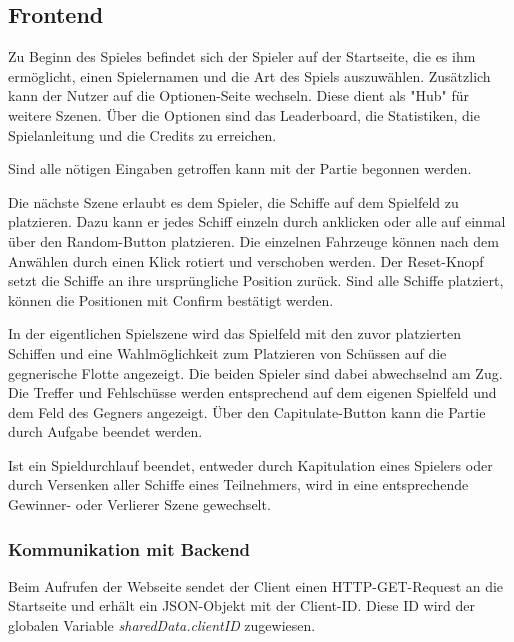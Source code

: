 \documentclass[a4paper, 10pt, conference]{IEEEtran}
\begin{document}
\subsection{Frontend}\label{subsec:frontend}

Zu Beginn des Spieles befindet sich der Spieler auf der Startseite, die es ihm ermöglicht, einen Spielernamen und die Art des Spiels auszuwählen. Zusätzlich kann der Nutzer auf die Optionen-Seite wechseln. Diese dient als "Hub" für weitere Szenen. Über die Optionen sind das Leaderboard, die Statistiken, die Spielanleitung und die Credits zu erreichen. 


Sind alle nötigen Eingaben getroffen kann mit der Partie begonnen werden.

Die nächste Szene erlaubt es dem Spieler, die Schiffe auf dem Spielfeld zu platzieren. Dazu kann er jedes Schiff einzeln durch anklicken oder alle auf einmal über den Random-Button platzieren. Die einzelnen Fahrzeuge können nach dem Anwählen durch einen Klick rotiert und verschoben werden. Der Reset-Knopf setzt die Schiffe an ihre ursprüngliche Position zurück. Sind alle Schiffe platziert, können die Positionen mit Confirm bestätigt werden.

In der eigentlichen Spielszene wird das Spielfeld mit den zuvor platzierten Schiffen und eine Wahlmöglichkeit zum Platzieren von Schüssen auf die gegnerische Flotte angezeigt. Die beiden Spieler sind dabei abwechselnd am Zug. Die Treffer und Fehlschüsse werden entsprechend auf dem eigenen Spielfeld und dem Feld des Gegners angezeigt. Über den Capitulate-Button kann die Partie durch Aufgabe beendet werden. 

Ist ein Spieldurchlauf beendet, entweder durch Kapitulation eines Spielers oder durch Versenken aller Schiffe eines Teilnehmers, wird in eine entsprechende Gewinner- oder Verlierer Szene gewechselt.




\subsubsection{Kommunikation mit Backend}\label{subsec:comwithbackend}

Beim Aufrufen der Webseite sendet der Client einen HTTP-GET-Request an die Startseite und erhält ein JSON-Objekt mit der Client-ID. Diese ID wird der globalen Variable \textit{sharedData.clientID} zugewiesen.
\end{document}
